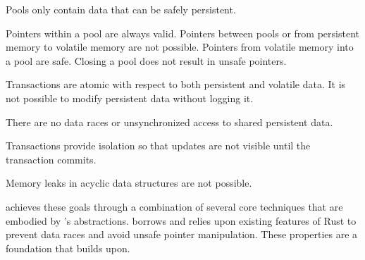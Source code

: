 \begin{goal}
  Pools only contain data that can be safely persistent.\label{goal:only-persistent-objects}
\end{goal}
\begin{goal}
  Pointers within a pool are always valid.  Pointers between pools or from
  persistent memory to volatile memory are not possible.  Pointers from
  volatile memory into a pool are safe.  Closing a pool does not result in
  unsafe pointers.\label{goal:ptrs-are-safe}
\end{goal}
\begin{goal}
  Transactions are atomic with respect to both persistent and volatile data.
  It is not possible to modify persistent data without logging
  it.\label{goal:atomic-is-atomic}
\end{goal}
\begin{goal}[No-Races]
  There are no data races or unsynchronized access to shared persistent data. \label{goal:no-races}
\end{goal}
\begin{goal}
  Transactions provide isolation so that updates are not visible until the transaction commits. \label{goal:atomic-is-isolated}
\end{goal}
\begin{goal}
  Memory leaks in acyclic data structures are not possible. \label{goal:no-memory-leaks}
\end{goal}

\This{} achieves these goals through a combination of several core techniques
that are embodied by \this{}'s abstractions.  \This{} borrows and relies
upon existing features of Rust to prevent data races and avoid unsafe pointer
manipulation.  These properties are a foundation that \this{} builds upon.

